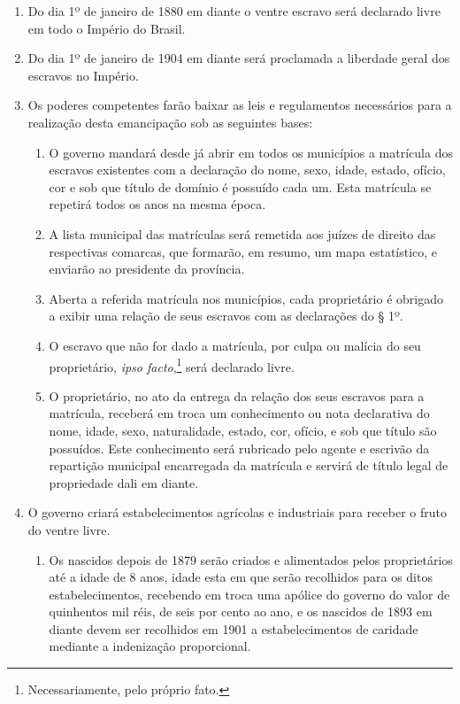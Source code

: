 \begin{enumerate}[label=Art. \arabic*º]
\item Do dia 1º de janeiro de 1880 em diante o ventre escravo será
declarado livre em todo o Império do Brasil.

\item Do dia 1º de janeiro de 1904 em diante será proclamada a
liberdade geral dos escravos no Império.

\item Os poderes competentes farão baixar as leis e regulamentos
necessários para a realização desta emancipação sob as seguintes
bases:

\begin{enumerate}[label=§ \arabic*º]
\item O governo mandará desde já abrir em todos os municípios a
matrícula dos escravos existentes com a declaração do nome, sexo, idade,
estado, ofício, cor e sob que título de domínio é possuído cada um. Esta
matrícula se repetirá todos os anos na mesma época.

\item A lista municipal das matrículas será remetida aos juízes de
direito das respectivas comarcas, que formarão, em resumo, um mapa
estatístico, e enviarão ao presidente da província.

\item Aberta a referida matrícula nos municípios, cada proprietário é
obrigado a exibir uma relação de seus escravos com as declarações do § 1º.

\item O escravo que não for dado a matrícula, por culpa ou malícia do
seu proprietário, \emph{ipso facto},\footnote{Necessariamente, pelo
  próprio fato.} será declarado livre.

\item O proprietário, no ato da entrega da relação dos seus escravos
para a matrícula, receberá em troca um conhecimento ou nota declarativa
do nome, idade, sexo, naturalidade, estado, cor, ofício, e sob que
título são possuídos. Este conhecimento será rubricado pelo agente e
escrivão da repartição municipal encarregada da matrícula e servirá de
título legal de propriedade dali em diante.
\end{enumerate}

\item O governo criará estabelecimentos agrícolas e industriais para
receber o fruto do ventre livre.

\begin{enumerate}[label=§ \arabic*º]
\item Os nascidos depois de 1879 serão criados e alimentados pelos
proprietários até a idade de 8 anos, idade esta em que serão recolhidos
para os ditos estabelecimentos, recebendo em troca uma apólice do
governo do valor de quinhentos mil réis, de seis por cento ao ano, e os
nascidos de 1893 em diante devem ser recolhidos em 1901 a
estabelecimentos de caridade mediante a indenização proporcional.


\end{enumerate}
\end{enumerate}
